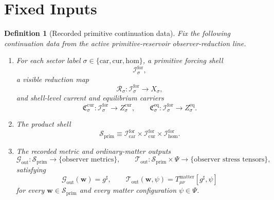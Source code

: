 \documentclass[11pt]{article}
\newcommand{\CompletedMetric}{g^{\sharp}}
\newcommand{\MatterSpace}{\Psi}
\newcommand{\Car}{\mathrm{car}}
\newcommand{\Cur}{\mathrm{cur}}
\newcommand{\Hom}{\mathrm{hom}}
\newcommand{\ForSpace}[1]{\mathcal I_{#1}^{\mathrm{for}}}
\newcommand{\PrimShell}{\mathcal S_{\mathrm{prim}}}
\newcommand{\Reduction}[1]{\mathcal R_{#1}}
\newcommand{\CurrentCarrier}[1]{\mathfrak C_{#1}^{\mathrm{cur}}}
\newcommand{\EqCarrier}[1]{\mathfrak C_{#1}^{\mathrm{eq}}}
\newcommand{\MetricOut}{\mathscr G_{\mathrm{out}}}
\newcommand{\MatterOut}{\mathscr T_{\mathrm{out}}}
\newtheorem{definition}{Definition}
\begin{document}
\section{Fixed Inputs}

\begin{definition}[Recorded primitive continuation data]
\label{def:fixed}
Fix the following continuation data from the active primitive-reservoir observer-reduction line.
\begin{enumerate}
    \item For each sector label \(\sigma\in\{\Car,\Cur,\Hom\}\), a primitive forcing shell
    \[
    \ForSpace{\sigma},
    \]
    a visible reduction map
    \[
    \Reduction{\sigma}:\ForSpace{\sigma}\to X_{\sigma},
    \]
    and shell-level current and equilibrium carriers
    \[
    \CurrentCarrier{\sigma}:\ForSpace{\sigma}\to Z_{\sigma}^{\mathrm{cur}},
    \qquad
    \EqCarrier{\sigma}:\ForSpace{\sigma}\to Z_{\sigma}^{\mathrm{eq}}.
    \]
    \item The product shell
    \[
    \PrimShell
    \equiv
    \ForSpace{\Car}\times \ForSpace{\Cur}\times \ForSpace{\Hom}.
    \]
    \item The recorded metric and ordinary-matter outputs
    \[
    \MetricOut:\PrimShell\to\{\text{observer metrics}\},
    \qquad
    \MatterOut:\PrimShell\times\MatterSpace\to\{\text{observer stress tensors}\},
    \]
    satisfying
    \begin{equation}
    \MetricOut(\mathbf w)=\CompletedMetric,
    \qquad
    \MatterOut(\mathbf w,\psi)
    =
    T_{\mu\nu}^{\mathrm{matter}}[\CompletedMetric,\psi]
    \label{eq:fixedoutputs}
    \end{equation}
    for every \(\mathbf w\in\PrimShell\) and every matter configuration \(\psi\in\MatterSpace\).
\end{enumerate}
\end{definition}
\end{document}
